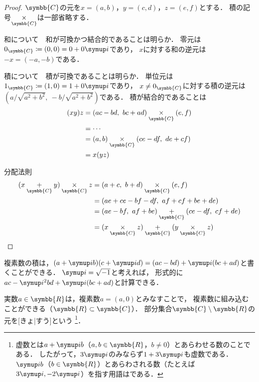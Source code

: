 \documentclass[../sotsu.tex]{subfiles}
\begin{document}
\begin{proof}
    $\symbb{C}$の元を$x = (a, b)$，$y = (c, d)$，$z = (e, f)$とする．
    積の記号$\underset{\symbb{C}}{\times}$は一部省略する．

    \textsf{和について}　和が可換かつ結合的であることは明らか．
    零元は$0_{\symbb{C}} \coloneq (0, 0) = 0 + 0\iu$であり，
    $x$に対する和の逆元は$-x = (-a, -b)$である．

    \textsf{積について}　積が可換であることは明らか．
    単位元は$1_{\symbb{C}} \coloneq (1, 0) = 1 + 0\iu$であり，
    $x \neq 0_{\symbb{C}}$に対する積の逆元は$(a / \sqrt{a^2 + b^2}, \  -b / \sqrt{a^2 + b^2} )$である．
    積が結合的であることは
    \begin{equation*}
        \begin{split}
            (xy)z &= (ac-bd, \  bc+ad) \underset{\symbb{C}}{\times} (e, f)   \\
                  &= \cdots  \\
                  &= (a, b) \underset{\symbb{C}}{\times} (ce-df, \  de+cf)   \\
                  &= x(yz)
        \end{split}
    \end{equation*}

    \textsf{分配法則}　
    \begin{equation*}
        \begin{split}
            (x \underset{\symbb{C}}{+} y) \underset{\symbb{C}}{\times} z
            &= (a+c, \  b+d) \underset{\symbb{C}}{\times} (e, f)   \\ 
            &= (ae+ce-bf-df, \  af+cf+be+de)   \\
            &= (ae-bf, \  af+be) \underset{\symbb{C}}{+} (ce-df, \  cf+de)   \\
            &= (x \underset{\symbb{C}}{\times} z) \underset{\symbb{C}}{+}
               (y \underset{\symbb{C}}{\times} z)
        \end{split}
    \end{equation*}
\end{proof}

複素数の積は，$(a + \iu b) (c + \iu d) = (ac - bd) + \iu (bc + ad)$と書くことができる．
$\iu = \sqrt{-1}$と考えれば，
形式的に$ac - \iu^2 bd + \iu (bc + ad)$と計算できる．

実数$a \in \symbb{R}$は，複素数$a = (a, 0)$とみなすことで，
複素数に組み込むことができる（$\symbb{R} \subset \symbb{C}$）．
部分集合$\symbb{C} \setminus \symbb{R}$の元を[きょ|すう]という%
\footnote{
    虚数とは$a + \iu b$（$a, b \in \symbb{R}$，$b \neq 0$）とあらわせる数のことである．
    したがって，$3\iu$のみならず$1 + 3\iu$も虚数である．
    $\iu b$（$b \in \symbb{R}$）とあらわされる数（たとえば$3\iu, -2\iu$）を指す用語はである．
}．
\end{document}
